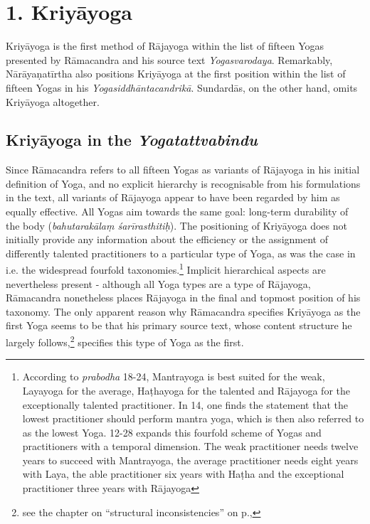 \section{1. Kriyāyoga}

Kriyāyoga is the first method of Rājayoga within the list of fifteen Yogas presented by Rāmacandra and his source text \textit{Yogasvarodaya}. Remarkably, Nārāyaṇatīrtha also positions Kriyāyoga at the first position within the list of fifteen Yogas in his \textit{Yogasiddhāntacandrikā}. Sundardās, on the other hand, omits Kriyāyoga altogether. 

\subsection{Kriyāyoga in the \textit{Yogatattvabindu}}
\label{kriyaintro}
Since Rāmacandra refers to all fifteen Yogas as variants of Rājayoga in his initial definition of Yoga, and no explicit hierarchy is recognisable from his formulations in the text, all variants of Rājayoga appear to have been regarded by him as equally effective. All Yogas aim towards the same goal: long-term durability of the body (\textit{bahutarakālaṃ śarīrasthitiḥ}). The positioning of Kriyāyoga does not initially provide any information about the efficiency or the assignment of differently talented practitioners to a particular type of Yoga, as was the case in i.e. the widespread fourfold taxonomies.\footnote{According to \textit{prabodha} 18-24, Mantrayoga is best suited for the weak, Layayoga for the average, Haṭhayoga for the talented and Rājayoga for the exceptionally talented practitioner. In  14, one finds the statement that the lowest practitioner should perform mantra yoga, which is then also referred to as the lowest Yoga.  12-28 expands this fourfold scheme of Yogas and practitioners with a temporal dimension. The weak practitioner needs twelve years to succeed with Mantrayoga, the average practitioner needs eight years with Laya, the able practitioner six years with Haṭha and the exceptional practitioner three years with Rājayoga} Implicit hierarchical aspects are nevertheless present - although all Yoga types are a type of Rājayoga, Rāmacandra nonetheless places Rājayoga in the final and topmost position of his taxonomy.
The only apparent reason why Rāmacandra specifies Kriyāyoga as the first Yoga seems to be that his primary source text, whose content structure he largely follows,\footnote{see the chapter on ``structural inconsistencies'' on p.\pageref{struktur},} specifies this type of Yoga as the first.

